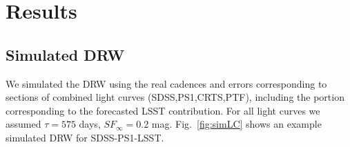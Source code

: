 \documentclass[twocolumn]{aastex62}
\begin{document}




\section{Results}

\subsection{Simulated DRW}

We simulated the DRW using the real cadences and errors corresponding to sections of combined light curves (SDSS,PS1,CRTS,PTF), including the portion corresponding to the forecasted LSST contribution. For all light curves we assumed  $\tau = 575 $ days, $SF_{\infty} = 0.2$ mag. Fig.~\ref{fig:simLC} shows an example simulated DRW for SDSS-PS1-LSST.

\begin{figure*}%
\caption{Simulated DRW process sampled at real cadence of SDSS, PS1, and simulated cadence of LSST. To each sampled point we add Gaussian noise. Since errors are heteroscedastic (different for all points),  corresponding to real light curve errors, or magnitude-dependent LSST simulated errors, distributions from which the offsets are  of different width, equal to photometric uncertainty at that epoch. }
\label{fig:simLC}
\end{figure*} 
\end{document}
